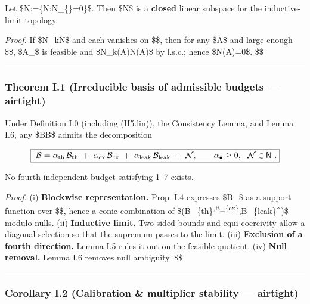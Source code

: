 \documentclass[
]{article}
\numberwithin{equation}{section}
\begin{document}
Let
\$\mathsf N:=\{\mathcal N:\mathcal N\textbar\_\{\}=0\}\$.
Then \$\mathsf N\$ is a \textbf{closed} linear subspace for the
inductive-limit topology.

\emph{Proof.} If \$\mathcal N\_k\to\mathcal N\$ and each vanishes on
\$\$, then for any \$A\in{}\$
and large enough \$\Lambda\$, \$A\textbar\_\Lambda\$ is feasible and
\$\mathcal N\_k(A)\to \mathcal N(A)\$ by l.s.c.; hence
\$\mathcal N(A)=0\$. \$\square\$

\begin{center}\rule{0.5\linewidth}{0.5pt}\end{center}

\hypertarget{theorem-i.1-irreducible-basis-of-admissible-budgets-airtight}{%
\subsubsection{Theorem I.1 (Irreducible basis of admissible budgets ---
airtight)}\label{theorem-i.1-irreducible-basis-of-admissible-budgets-airtight}}

Under Definition I.0 (including (H5.lin)), the Consistency Lemma, and
Lemma I.6, any \$\mathcal B\in\mathfrak B\$ admits the decomposition

\[
\boxed{\ \mathcal B=\alpha_{\rm th}\,\mathcal B_{\rm th}\;+\;\alpha_{\rm cx}\,\mathcal B_{\rm cx}\;+\;\alpha_{\rm leak}\,\mathcal B_{\rm leak}\;+\;\mathcal N,\qquad \alpha_\bullet\ge0,\ \ \mathcal N\in\mathsf N\ .}
\]

No fourth independent budget satisfying 1--7 exists.

\emph{Proof.} (i) \textbf{Blockwise representation.} Prop. I.4 expresses
\$\mathcal B\_\Lambda\$ as a support function over
\$\$, hence a
conic combination of
\$(\mathcal B\_\{\rm th\}\textsuperscript{\Lambda,\mathcal B\_\{\rm cx\}}\Lambda,\mathcal B\_\{\rm leak\}\^{}\Lambda)\$
modulo nulls. (ii) \textbf{Inductive limit.} Two-sided bounds and
equi-coercivity allow a diagonal selection so that the supremum passes
to the limit. (iii) \textbf{Exclusion of a fourth direction.} Lemma I.5
rules it out on the feasible quotient. (iv) \textbf{Null removal.} Lemma
I.6 removes null ambiguity. \$\square\$

\begin{center}\rule{0.5\linewidth}{0.5pt}\end{center}

\hypertarget{corollary-i.2-calibration-multiplier-stability-airtight}{%
\subsubsection{Corollary I.2 (Calibration \& multiplier stability ---
airtight)}\label{corollary-i.2-calibration-multiplier-stability-airtight}}
\end{document}
